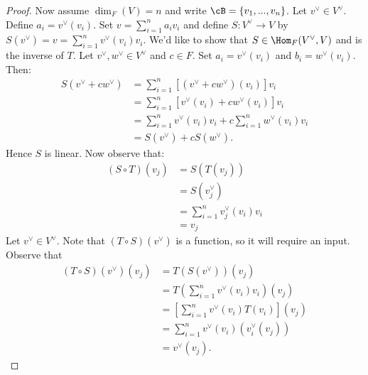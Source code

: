 \begin{proof}
            Now assume $\dim_F{(V)} = n$ and write $\cB = \{v_1,...,v_n\}$. Let $v^\vee \in V^\vee$. Define $a_i = v^\vee(v_i)$. Set $v = \sum_{i=1}^n a_i v_i$ and define $S:V^\vee \rightarrow V$ by $S(v^\vee) = v = \sum_{i=1}^n v^\vee (v_i) v_i$. We'd like to show that $S \in \Hom_F{(V^\vee,V)}$ and is the inverse of $T$. Let $v^\vee,w^\vee \in V^\vee$ and $c \in F$. Set $a_i = v^\vee(v_i)$ and $b_i = w^\vee(v_i)$. Then:
                \begin{equation*}
                \begin{split}
                    S(v^\vee + cw^\vee)
                    & = \sum_{i=1}^n \left[(v^\vee + c w^\vee)(v_i) \right]v_i \\
                    & = \sum_{i=1}^n\left[ v^\vee(v_i) + c w^\vee(v_i)\right]v_i \\
                    & = \sum_{i=1}^n v^\vee(v_i)v_i + c \sum_{i=1}^n w^\vee(v_i)v_i \\
                    & = S(v^\vee) + cS(w^\vee).
                \end{split}
                \end{equation*}
            Hence $S$ is linear. Now observe that:
                \begin{equation*}
                \begin{split}
                    (S \circ T)(v_j)
                    & = S(T(v_j)) \\
                    & = S(v_j^\vee) \\
                    & = \sum_{i=1}^n v_j^\vee(v_i)v_i \\
                    & = v_j
                \end{split}
                \end{equation*}
            Let $v^\vee \in V^\vee$. Note that $(T\circ S)(v^\vee)$ is a function, so it will require an input. Observe that
                \begin{equation*}
                \begin{split}
                    (T\circ S)(v^\vee)(v_j)
                    & = T(S(v^\vee))(v_j) \\
                    & = T(\sum_{i=1}^n v^\vee(v_i)v_i)(v_j) \\
                    & = \left[\sum_{i=1}^n v^\vee(v_i)T(v_i)\right](v_j) \\
                    & = \sum_{i=1}^n v^\vee(v_i)(v^\vee_i(v_j)) \\
                    & = v^\vee(v_j).
                \end{split}
                \end{equation*}
        \end{proof}

